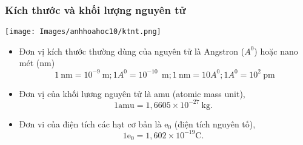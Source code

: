 \subsubsection{Kích thước và khối lượng nguyên tử}
\begin{center}
	\texttt{[image: Images/anhhoahoc10/ktnt.png]}\\
	\label{fig:m-q-hatcoban}
\end{center}
\vspace*{0.25cm}
\begin{note}
	\begin{itemize}
		\item Đơn vị kích thước thường dùng của nguyên tử là Angstron ($ A^0 $) hoặc nano mét (nm)			
		$$1 \mathrm{~nm}=10^{-9}~\mathrm{m} ; 1 A^0=10^{-10}~\mathrm{~m} ; 1 \mathrm{~nm}=10 A^0; 1 A^0=10^{2}~\mathrm{pm}$$
		\begin{center}
		\end{center}
		\item Đơn vị của khối lương nguyên tử là amu (atomic mass unit),
		$$
		1 \mathrm{amu}=1,6605 \times 10^{-27} \mathrm{~kg} \text {. }
		$$
		\item Đơn vi của điện tích các hạt cơ bản là $\mathrm{e}_0$ (điện tích nguyên tố),
		$$
		1 \mathrm{e}_0=1,602 \times 10^{-19} \mathrm{C} \text {. }
		$$
	\end{itemize}
\end{note}